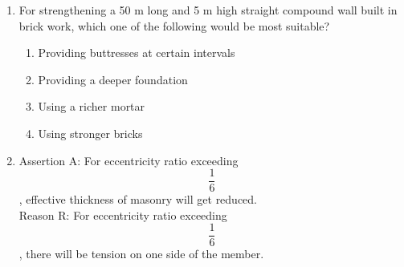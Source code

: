 \documentclass[11pt,a4paper]{article}
\begin{document}
\begin{enumerate}
{A high lime content in a composite cement-lime mortar results in \\

(i) Slow hardening \\

(ii) Quick setting \\

(iii) Weaker mortar}
\begin{enumerate}[label=\Alph*.]
\item{(ii) and (iii) are correct}
\item{(i) and (ii) are correct}
\item{(i) and (iii) are correct}
\item{(i), (ii) and (iii) are correct}
\end{enumerate}
\item{For strengthening a 50 m long and 5 m high straight compound wall built in brick work, which one of the following would be most suitable?}
\begin{enumerate}[label=\Alph*.]
\item{Providing buttresses at certain intervals}
\item{Providing a deeper foundation}
\item{Using a richer mortar}
\item{Using stronger bricks}
\end{enumerate}
\item{Assertion A: For eccentricity ratio exceeding $$\frac{1}{6}$$, effective thickness of masonry will get reduced. \\
Reason R: For eccentricity ratio exceeding $$\frac{1}{6}$$, there will be tension on one side of the member. \\

}
\end{enumerate}
\end{document}
